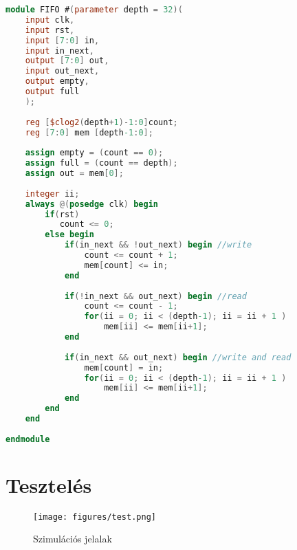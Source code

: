 \begin{lstlisting}[frame=single,language=verilog,caption={FIFO verilog modul},captionpos=b,label={lst:fifo}]
module FIFO #(parameter depth = 32)(
    input clk,
    input rst,
    input [7:0] in,
    input in_next,
    output [7:0] out,
    input out_next,
    output empty,
    output full
    );
    
    reg [$clog2(depth+1)-1:0]count;
    reg [7:0] mem [depth-1:0];
    
    assign empty = (count == 0);
    assign full = (count == depth);
    assign out = mem[0];
    
    integer ii;
    always @(posedge clk) begin
        if(rst)
           count <= 0;
        else begin            
            if(in_next && !out_next) begin //write
                count <= count + 1;
                mem[count] <= in;
            end
            
            if(!in_next && out_next) begin //read
                count <= count - 1;
                for(ii = 0; ii < (depth-1); ii = ii + 1 )
                    mem[ii] <= mem[ii+1];
            end
            
            if(in_next && out_next) begin //write and read
                mem[count] = in;                
                for(ii = 0; ii < (depth-1); ii = ii + 1 )
                    mem[ii] <= mem[ii+1];
            end
        end
    end
    
endmodule
\end{lstlisting}
\section{Tesztelés}
\begin{figure}[h]
\begin{center}
\texttt{[image: figures/test.png]}
\caption{Szimulációs jelalak}
\label{fig:Testsim}
\end{center}
\end{figure}

